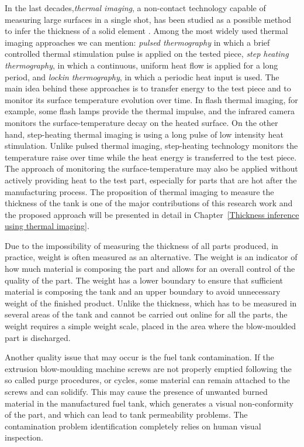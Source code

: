 In the last decades,\textit{thermal imaging}, a non-contact technology capable of measuring large surfaces in a single shot, has been studied as a possible method to infer the thickness of a solid element \citep{sun2003method,sun2006analysis,choi2008quantitative,benitez2008definition,zeng2012absolute,li2018thickness,he2013eddy}. Among the most widely used thermal imaging approaches we can mention: \textit{pulsed thermography} in which a brief controlled thermal stimulation pulse is applied on the tested piece, \textit{step heating thermography}, in which a continuous, uniform heat flow is applied for a long period, and \textit{lockin thermography}, in which a periodic heat input is used. The main idea behind these approaches is to transfer energy to the test piece and to monitor its surface temperature evolution over time. In flash thermal imaging, for example, some flash lamps provide the thermal impulse, and the infrared camera monitors the surface-temperature decay on the heated surface. On the other hand, step-heating thermal imaging is using a long pulse of low intensity heat stimulation. Unlike pulsed thermal imaging, step-heating technology monitors the temperature raise over time while the heat energy is transferred to the test piece. The approach of monitoring the surface-temperature may also be applied without actively providing heat to the test part, especially for parts that are hot after the manufacturing process. The proposition of thermal imaging to measure the thickness of the tank is one of the major contributions of this research work and the proposed approach will be presented in detail in Chapter~\ref{Thickness inference using thermal imaging}.

Due to the impossibility of measuring the thickness of all parts produced, in practice, weight is often measured as an alternative. The weight is an indicator of how much material is composing the part and allows for an overall control of the quality of the part. The weight has a lower boundary to ensure that sufficient material is composing the tank and an upper boundary to avoid unnecessary weight of the finished product. Unlike the thickness, which has to be measured in several areas of the tank and cannot be carried out online for all the parts, the weight requires a simple weight scale, placed in the area where the blow-moulded part is discharged. 

Another quality issue that may occur is the fuel tank contamination. If the extrusion blow-moulding machine screws are not properly emptied following the so called purge procedures, or cycles, some material can remain attached to the screws and can solidify. This may cause the presence of unwanted burned material in the manufactured fuel tank, which generates a visual non-conformity of the part, and which can lead to tank permeability problems. The contamination problem identification completely relies on human visual inspection.


